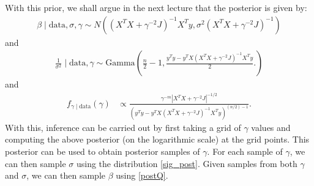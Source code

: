 \documentclass{scrartcl}
\begin{document}
With this prior, we shall argue in the next lecture that the posterior
is given by:
\begin{align}\label{postQ}
  \beta \mid \text{data}, \sigma, \gamma \sim N \left(\left(X^T X +
  \gamma^{-2} J
  \right)^{-1} X^T y, \sigma^2 \left(X^T X + \gamma^{-2} J \right)^{-1} \right)
\end{align}
and
\begin{align}\label{sig_post}
  \frac{1}{\sigma^2} \mid \text{data}, \gamma \sim
  \text{Gamma}\left(\frac{n}{2} - 1, \frac{y^T y - y^T X \left(X^T X + 
 \gamma^{-2} J \right)^{-1} X^T y}{2}. 
  \right) 
\end{align}
and
\begin{align*}
  f_{\gamma \mid \text{data}}(\gamma) &\propto   \frac{\gamma^{-m}
                                        \left|X^T X + \gamma^{-2} J  
    \right|^{-1/2}}{\left(y^T y - y^T X \left(X^T X + 
 \gamma^{-2} J \right)^{-1} X^T y \right)^{(n/2) - 1}}. 
\end{align*}
With this, inference can be carried out by first taking a grid of
$\gamma$ values and computing the above posterior (on the logarithmic
scale) at the grid points. This posterior can be used to obtain
posterior samples of $\gamma$. For each sample of $\gamma$, we can
then sample $\sigma$ using the distribution \eqref{sig_post}. Given
samples from both $\gamma$ and $\sigma$, we can then sample $\beta$
using \eqref{postQ}.








  

\end{document}
